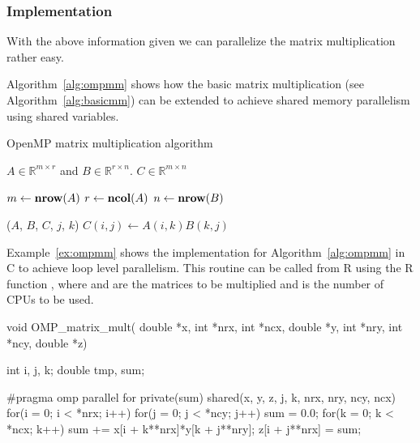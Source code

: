\subsubsection{Implementation}

With the above information given we can parallelize the matrix
multiplication rather easy.

Algorithm~\ref{alg:ompmm} shows how the basic matrix multiplication
(see Algorithm~\ref{alg:basicmm}) can be extended to achieve shared
memory parallelism using shared variables. 

\begin{algorithm}
\caption{OpenMP matrix multiplication algorithm}
\label{alg:ompmm}
\begin{algorithmic}[1]

  \REQUIRE $A \in \mathbb{R}^{m \times r}$ and $B \in \mathbb{R}^{r
    \times n}$.
  \ENSURE $C \in \mathbb{R}^{m \times n}$

  \STATE $m \leftarrow \textbf{nrow} (A)$
  \STATE $r \leftarrow \textbf{ncol} (A)$
  \STATE $n \leftarrow \textbf{nrow} (B)$

  \STATE \OMPFOR \OMPSHARE($A$, $B$, $C$, $j$, $k$)
         \STATE $C(i,j) \leftarrow A(i,k)B(k,j)$
       \ENDFOR
    \ENDFOR
  \ENDFOR

\end{algorithmic}
\end{algorithm}

Example~\ref{ex:ompmm} shows the implementation for
Algorithm~\ref{alg:ompmm} in C to achieve loop level parallelism. This
routine can be called from R
using the R function , where  and
 are the matrices to be multiplied and  is the
number of CPUs to be used.

\begin{Example}
\label{ex:ompmm}
\begin{Scode}
void OMP_matrix_mult( double *x, int *nrx, int *ncx,
		      double *y, int *nry, int *ncy,
		      double *z) {
  int i, j, k;
  double tmp, sum;

#pragma omp parallel for private(sum) shared(x, y, z, j, k, nrx, nry, ncy, ncx)
  for(i = 0; i < *nrx; i++)
    for(j = 0; j < *ncy; j++){
      sum = 0.0;
      for(k = 0; k < *ncx; k++) 
	sum += x[i + k**nrx]*y[k + j**nry];
      z[i + j**nrx] = sum;
    }
}
\end{Scode}
\end{Example}

